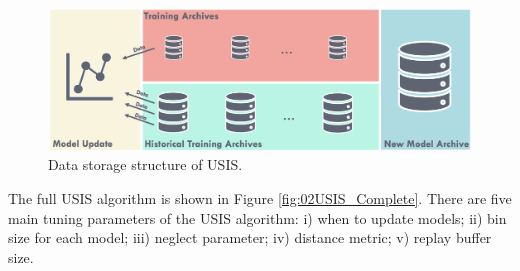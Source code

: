 \begin{figure}[h]
    \centering
    \includegraphics[width=\textwidth]{images/ch2/02USISData.jpeg}
    \caption{Data storage structure of USIS.}
    \label{fig:02USISData}
\end{figure}

The full USIS algorithm is shown in Figure \ref{fig:02USIS_Complete}.  There are five main tuning parameters of the USIS algorithm: i) when to update models; ii) bin size for each model; iii) neglect parameter; iv) distance metric; v) replay buffer size.

